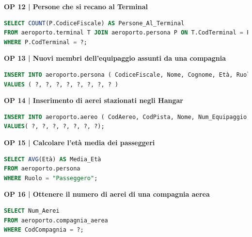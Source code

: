 \textbf{\small OP 12 | Persone che si recano al Terminal}\\

\begin{lstlisting}[language=SQL]
SELECT COUNT(P.CodiceFiscale) AS Persone_Al_Terminal
FROM aeroporto.terminal T JOIN aeroporto.persona P ON T.CodTerminal = P.CodTerminal
WHERE P.CodTerminal = ?;
\end{lstlisting}


\textbf{\small OP 13 | Nuovi membri dell'equipaggio assunti da una compagnia}\\

\begin{lstlisting}[language=SQL]
INSERT INTO aeroporto.persona ( CodiceFiscale, Nome, Cognome, Età, Ruolo, Ora_Inizio, Ora_fine, CodAereo )
VALUES ( ?, ?, ?, ?, ?, ?, ?, ? )	
\end{lstlisting}


\textbf{\small OP 14 | Inserimento di aerei stazionati negli Hangar}\\

\begin{lstlisting}[language=SQL]
INSERT INTO aeroporto.aereo ( CodAereo, CodPista, Nome, Num_Equipaggio, Peso, Tipologia, CodHangar)
VALUES( ?, ?, ?, ?, ?, ?, ?);	
\end{lstlisting}


\textbf{\small OP 15 | Calcolare l'età media dei passeggeri}\\

\begin{lstlisting}[language=SQL]
SELECT AVG(Età) AS Media_Età
FROM aeroporto.persona
WHERE Ruolo = "Passeggero";	
\end{lstlisting}


\textbf{\small OP 16 | Ottenere il numero di aerei di una compagnia aerea}\\

\begin{lstlisting}[language=SQL]
SELECT Num_Aerei
FROM aeroporto.compagnia_aerea
WHERE CodCompagnia = ?;	
\end{lstlisting}


